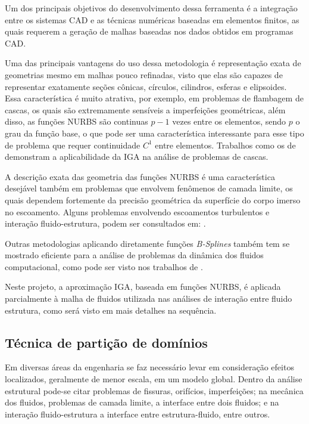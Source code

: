 \documentclass[tese_patricia.tex]{subfiles}
\begin{document}
Um dos principais objetivos do desenvolvimento dessa ferramenta é a integração entre os sistemas CAD e as técnicas numéricas baseadas em elementos finitos, as quais requerem a geração de malhas baseadas nos dados obtidos em programas CAD. 

Uma das principais vantagens do uso dessa metodologia é representação exata de geometrias mesmo em malhas pouco refinadas, visto que elas são capazes de representar exatamente seções cônicas, círculos, cilindros, esferas e elipsoides. Essa característica é muito atrativa, por exemplo, em problemas de flambagem de cascas, os quais são extremamente sensíveis a imperfeições geométricas, além disso, as funções NURBS são continuas $p-1$ vezes entre os elementos, sendo $p$ o grau da função base, o que pode ser uma característica interessante para esse tipo de problema que requer continuidade $C^1$ entre elementos. Trabalhos como os de  demonstram a aplicabilidade da IGA na análise de problemas de cascas.

A descrição exata das geometria das funções NURBS é uma característica desejável também em problemas que envolvem fenômenos de camada limite, os quais dependem fortemente da precisão geométrica da superfície do corpo imerso no escoamento. Alguns problemas envolvendo escoamentos turbulentos e interação fluido-estrutura, podem ser consultados em: .

Outras metodologias aplicando diretamente funções \textit{B-Splines} também tem se mostrado eficiente para a análise de problemas da dinâmica dos fluidos computacional, como pode ser visto nos trabalhos de .

Neste projeto, a aproximação IGA, baseada em funções NURBS, é aplicada parcialmente à malha de fluidos utilizada nas análises de interação entre fluido estrutura, como será visto em mais detalhes na sequência.


 
\subsection{Técnica de partição de domínios}
\label{arlequinsection}

Em diversas áreas da engenharia se faz necessário levar em consideração efeitos localizados, geralmente de menor escala, em um modelo global. Dentro da análise estrutural pode-se citar problemas de fissuras, orifícios, imperfeições; na mecânica dos fluidos, problemas de camada limite, a interface entre dois fluidos; e na interação fluido-estrutura a interface entre estrutura-fluido, entre outros.
\end{document}
